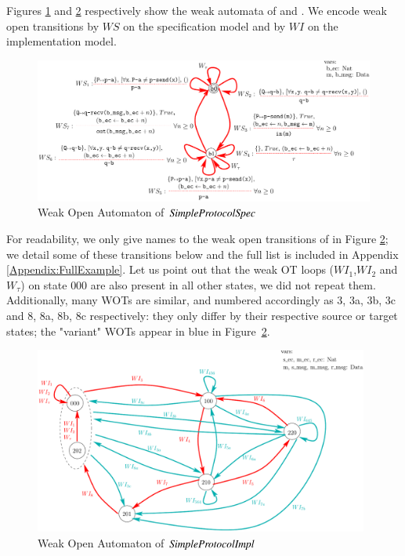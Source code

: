 \documentclass{elsarticle}
\begin{document}
  \begin{example}
    Figures \ref{SimpleProtCounter:WeakSpecOA} and \ref{SimpleProtCounter:ImplWOA2} respectively show the weak automata of  and . We encode weak open transitions  by $WS$ on the specification model and by $WI$ on the implementation model.
    



\begin{figure}[h]
   \centerline{\includegraphics[width=\linewidth]{XFIG/SPSpecWeakOpen}}
  \caption{Weak Open Automaton of  $\symb{SimpleProtocolSpec}$}
   \label{SimpleProtCounter:WeakSpecOA}
\end{figure}

 For readability, we only give names to the  weak open transitions of  in Figure \ref{SimpleProtCounter:ImplWOA2}; we detail some of these transitions below and the full list is included in Appendix \ref{Appendix:FullExample}.
Let us point out that the weak OT loops ($WI_1$,$WI_2$ and $W_\tau$) on state ${000}$ are also present in all other states, we did not repeat them. Additionally, many WOTs are similar, and numbered accordingly as 3, 3a, 3b, 3c and 8, 8a, 8b, 8c respectively: they only differ by their respective source or target states; the "variant" WOTs appear in blue in   Figure~\ref{SimpleProtCounter:ImplWOA2}.
\end{example}




\begin{figure}[h]
   \centerline{\includegraphics[width=11cm]{XFIG/SimpleProtImpl-WOA2}}
  \caption{Weak Open Automaton of $\symb{SimpleProtocolImpl}$}
   \label{SimpleProtCounter:ImplWOA2}
\end{figure}
\end{document}
